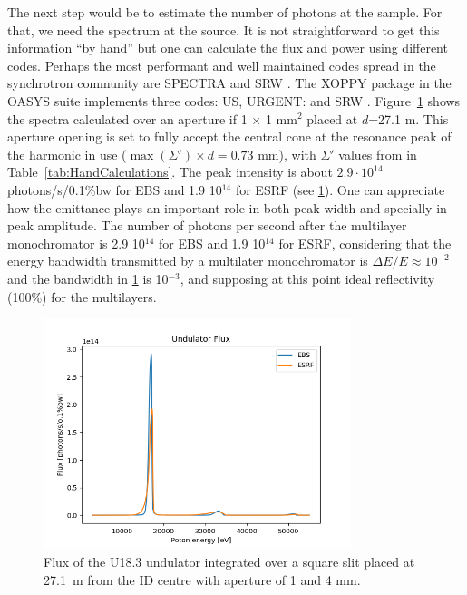 \documentclass{iucr}              %
\begin{document}
The next step would be to estimate the number of photons at the sample. For that, we need the spectrum at the source. It is not straightforward to get this information ``by hand'' but one can calculate the flux and power using different codes. Perhaps the most performant and well maintained codes spread in the synchrotron community are SPECTRA \cite{codeSPECTRA} and SRW \cite{codeSRW}. The XOPPY package in the OASYS suite implements three codes: US\cite{codeUS}, URGENT: \cite{codeURGENT} and SRW \cite{codeSRW}. Figure~\ref{fig:FluxU18} shows the spectra calculated over an aperture if 1 $\times$ 1 mm$^2$ placed at $d$=27.1 m. This aperture opening is set to fully accept the central cone at the resonance peak of the harmonic in use ($\max(\Sigma') \times d = 0.73$ mm), with $\Sigma'$ values from in Table~\ref{tab:HandCalculations}. The peak intensity is about  $2.9\cdot10^{14}$ photons/s/0.1{\%}bw for EBS and 1.9 10$^{14}$ for ESRF (see \ref{fig:FluxU18}). One can appreciate how the emittance plays an important role in both peak width and specially in peak amplitude. The number of photons per second after the multilayer monochromator is 2.9 10$^{14}$ for EBS and 1.9 10$^{14}$ for ESRF, considering that the energy bandwidth transmitted by a multilater monochromator is $\Delta E/E \approx 10^{-2}$ and the bandwidth in \ref{fig:FluxU18} is 10$^{-3}$, and supposing at this point ideal reflectivity (100\%) for the multilayers. 

\begin{figure}\label{fig:FluxU18}
    \centering
    \includegraphics[width=0.8\textwidth]{GRAPHICS/fluxU18.png}
    \caption{Flux of the U18.3 undulator integrated over a square slit placed at 27.1~m from the ID centre with aperture of 1 and 4 mm.}
\end{figure}
\end{document}
